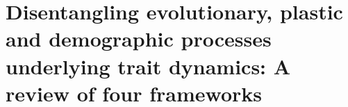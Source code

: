 \chapter[Evolution or plasticity?]{Disentangling evolutionary, plastic and demographic processes underlying trait dynamics: A review of four frameworks}